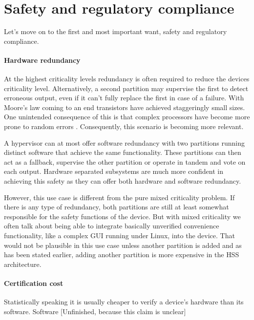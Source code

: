 \section{Safety and regulatory compliance \label{safety-analysis}}
 Let's move on to the first and most important want, safety and regulatory compliance. 
 \paragraph{Hardware redundancy}
 At the highest criticality levels redundancy is often required to reduce the devices criticality level. Alternatively, a second partition may supervise the first to detect erroneous output, even if it can't fully replace the first in case of a failure. With Moore's law coming to an end transistors have achieved staggeringly small sizes. One unintended consequence of this is that complex processors have become more prone to random errors \cite{Constantinescu.2003}. Consequently, this scenario is becoming more relevant.
 
 A hypervisor can at most offer software redundancy with two partitions running distinct software that achieve the same functionality. These partitions can then act as a fallback, supervise the other partition or operate in tandem and vote on each output. Hardware separated subsystems are much more confident in achieving this safety as they can offer both hardware and software redundancy. 
 
However, this use case is different from the pure mixed criticality problem. If there is any type of redundancy, both partitions are still at least somewhat responsible for the safety functions of the device. But with mixed criticality we often talk about being able to integrate basically unverified convenience functionality, like a complex GUI running under Linux, into the device. That would not be plausible in this use case unless another partition is added and as has been stated earlier, adding another partition is more expensive in the \gls{HSS} architecture.

\paragraph{Certification cost}
Statistically speaking it is usually cheaper to verify a device's hardware than its software. Software  [Unfinished, because this claim is unclear]


